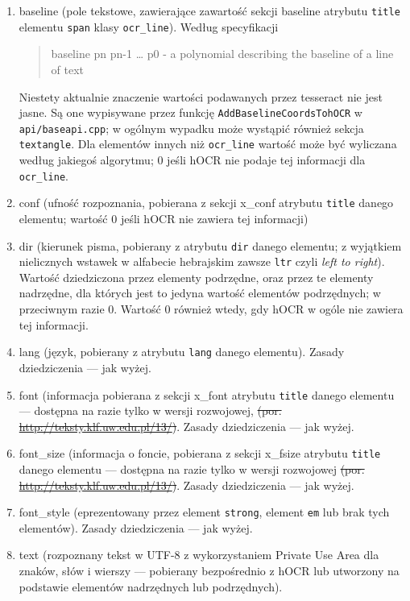 \documentclass[12]{mwart}
\def\f#1{\colorbox{black!15}{\textsf{#1}}}
\begin{document}
\begin{enumerate}
\item \f{baseline} (pole tekstowe, zawierające zawartość sekcji
  \textsf{baseline} atrybutu \texttt{title} elementu \texttt{span}
  klasy \texttt{ocr_line}). Według specyfikacji
  \begin{quote}
    baseline pn pn-1 … p0 - a polynomial describing the baseline of a
    line of text
  \end{quote}
  Niestety aktualnie znaczenie wartości podawanych przez
  \textsf{tesseract} nie jest jasne. Są one wypisywane przez funkcję
  \texttt{AddBaselineCoordsTohOCR} w \texttt{api/baseapi.cpp}; w
  ogólnym wypadku może wystąpić również sekcja \texttt{textangle}. Dla
  elementów innych niż \texttt{ocr_line} wartość może być wyliczana
  według jakiegoś algorytmu; 0 jeśli hOCR nie podaje tej informacji
  dla \texttt{ocr_line}.
\item \f{conf} (ufność rozpoznania, pobierana z sekcji \textsf{x_conf}
  atrybutu \texttt{title} danego elementu; wartość 0 jeśli hOCR nie zawiera tej informacji)
\item \f{dir} (kierunek pisma, pobierany z atrybutu \texttt{dir} danego
  elementu; z wyjątkiem nielicznych wstawek w alfabecie hebrajskim
  zawsze \texttt{ltr} czyli \textit{left to right}). Wartość
  dziedziczona przez elementy podrzędne, oraz przez te elementy
  nadrzędne, dla których jest to jedyna wartość elementów podrzędnych;
  w przeciwnym razie 0. Wartość 0 również wtedy, gdy hOCR w ogóle nie
  zawiera tej informacji.
\item \f{lang} (język, pobierany z atrybutu \texttt{lang} danego
  elementu). Zasady dziedziczenia --- jak wyżej.
\item \f{font} (informacja pobierana z sekcji \textsf{x_font}
  atrybutu \texttt{title} danego elementu --- dostępna na razie tylko w
  wersji rozwojowej,
  \sout{(por. \url{http://teksty.klf.uw.edu.pl/13/})}. Zasady dziedziczenia --- jak wyżej.

\item \f{font_size}  (informacja o foncie, pobierana z sekcji \textsf{x_fsize}
  atrybutu \texttt{title} danego elementu --- dostępna na razie tylko w
  wersji rozwojowej
  \sout{(por. \url{http://teksty.klf.uw.edu.pl/13/})}. Zasady dziedziczenia --- jak wyżej.
\item \f{font_style} (eprezentowany przez element \texttt{strong}, element
  \texttt{em} lub brak tych elementów). Zasady dziedziczenia --- jak wyżej.
\item \f{text} (rozpoznany tekst w UTF-8 z wykorzystaniem Private Use Area
  dla znaków, słów i wierszy --- pobierany bezpośrednio z hOCR lub
  utworzony na podstawie elementów nadrzędnych lub podrzędnych).

\end{enumerate}
\end{document}
